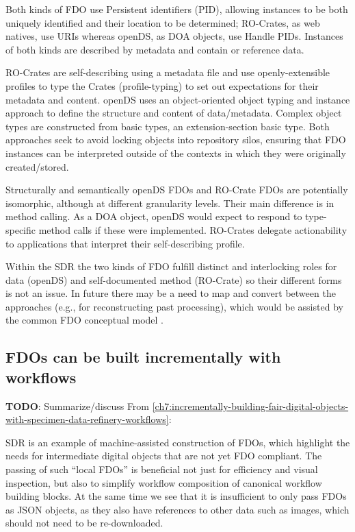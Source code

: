 Both kinds of FDO use Persistent identifiers (PID), allowing instances
to be both uniquely identified and their location to be determined;
RO-Crates, as web natives, use URIs whereas openDS, as DOA objects, use
Handle PIDs. Instances of both kinds are described by metadata and
contain or reference data.

RO-Crates are self-describing using a metadata file and use
openly-extensible profiles to type the Crates (profile-typing) to set
out expectations for their metadata and content. openDS uses an
object-oriented object typing and instance approach to define the
structure and content of data/metadata. Complex object types are
constructed from basic types, an extension-section basic type. Both
approaches seek to avoid locking objects into repository silos, ensuring
that FDO instances can be interpreted outside of the contexts in which
they were originally created/stored.

Structurally and semantically openDS FDOs and RO-Crate FDOs are
potentially isomorphic, although at different granularity levels. Their
main difference is in method calling. As a DOA object, openDS would
expect to respond to type-specific method calls if these were
implemented. RO-Crates delegate actionability to applications that
interpret their self-describing profile.

Within the SDR the two kinds of FDO fulfill distinct and interlocking
roles for data (openDS) and self-documented method (RO-Crate) so their
different forms is not an issue. In future there may be a need to map
and convert between the approaches (e.g., for reconstructing past
processing), which would be assisted by the common FDO conceptual model
\cite{bonino2019}.



\subsection{FDOs can be built incrementally with workflows}
\textbf{TODO}: Summarize/discuss 
From \vref{ch7:incrementally-building-fair-digital-objects-with-specimen-data-refinery-workflows}:


SDR is an example of machine-assisted construction of FDOs, which
highlight the needs for intermediate digital objects that are not yet
FDO compliant. The passing of such ``local FDOs'' is beneficial not just
for efficiency and visual inspection, but also to simplify workflow
composition of canonical workflow building blocks. At the same time we
see that it is insufficient to only pass FDOs as JSON objects, as they
also have references to other data such as images, which should not need
to be re-downloaded.

